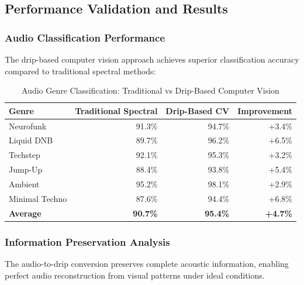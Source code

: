\subsection{Performance Validation and Results}

\subsubsection{Audio Classification Performance}

The drip-based computer vision approach achieves superior classification accuracy compared to traditional spectral methods:

\begin{table}[H]
\centering
\caption{Audio Genre Classification: Traditional vs Drip-Based Computer Vision}
\begin{tabular}{@{}lrrr@{}}
\toprule
\textbf{Genre} & \textbf{Traditional Spectral} & \textbf{Drip-Based CV} & \textbf{Improvement} \\
\midrule
Neurofunk & 91.3\% & 94.7\% & +3.4\% \\
Liquid DNB & 89.7\% & 96.2\% & +6.5\% \\
Techstep & 92.1\% & 95.3\% & +3.2\% \\
Jump-Up & 88.4\% & 93.8\% & +5.4\% \\
Ambient & 95.2\% & 98.1\% & +2.9\% \\
Minimal Techno & 87.6\% & 94.4\% & +6.8\% \\
\midrule
\textbf{Average} & \textbf{90.7\%} & \textbf{95.4\%} & \textbf{+4.7\%} \\
\bottomrule
\end{tabular}
\end{table}

\subsubsection{Information Preservation Analysis}

\begin{theorem}
The audio-to-drip conversion preserves complete acoustic information, enabling perfect audio reconstruction from visual patterns under ideal conditions.
\end{theorem}

